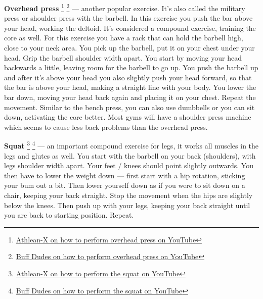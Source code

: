 \documentclass[openany, 12pt]{book}
\begin{document}
        \textbf{Overhead press}
        \footnote{\href{https://www.youtube.com/watch?v=2N5P_iWkluQ}{Athlean-X on how to perform overhead press on YouTube}}
        \footnote{\href{https://www.youtube.com/watch?v=F3QY5vMz_6I}{Buff Dudes on how to perform overhead press on YouTube}}
        --- another popular exercise. It's also called the military press or shoulder press with the barbell. In this exercise you push the bar above your head, working the
        deltoid. It's considered a compound exercise, training the core as well. For this exercise you have a rack that can hold the barbell high, close to your neck area. You pick up
        the barbell, put it on your chest under your head. Grip the barbell shoulder width apart. You start by moving your head backwards a little, leaving room for the barbell to go up.
        You push the barbell up and after it's above your head you also slightly push your head forward, so that the bar is above your head, making a straight line with your body. You lower
        the bar down, moving your head back again and placing it on your chest. Repeat the movement. Similar to the bench press, you can also use dumbbells or you can sit down, activating the
        core better. Most gyms will have a shoulder press machine which seems to cause less back problems than the overhead press.

        \textbf{Squat}
        \footnote{\href{https://www.youtube.com/watch?v=q1fCgfieNEs}{Athlean-X on how to perform the squat on YouTube}}
        \footnote{\href{https://www.youtube.com/watch?v=Dy28eq2PjcM}{Buff Dudes on how to perform the squat on YouTube}}
        --- an important compound exercise for legs, it works all muscles in the legs and glutes as well. You start with the barbell on your back (shoulders), with legs shoulder width apart.
        Your feet / knees should point slightly outwards.
        You then have to lower the weight down --- first start with a hip rotation, sticking your bum out a bit. Then lower yourself down as if you were to sit down on a chair, keeping your
        back straight. Stop the movement when the hips are slightly below the knees. Then push up with your legs, keeping your back straight until you are back to starting position. Repeat.
\end{document}
